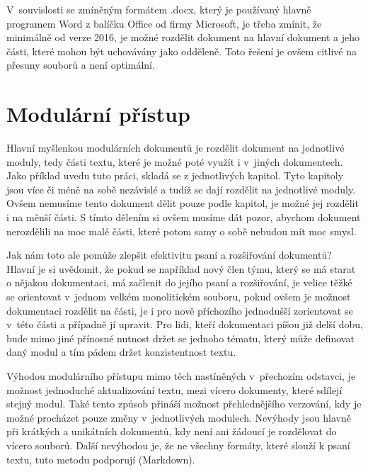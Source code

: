 V~souvislosti se zmíněným formátem .docx, který je používaný hlavně programem Word z balíčku Office od firmy Microsoft, je třeba zmínit, že minimálně od verze 2016, je
možné rozdělit dokument na hlavní dokument a jeho části, které mohou být uchovávány jako odděleně. \cite{msWord} Toto řešení je ovšem citlivé na přesuny souborů
a není optimální.

\section{Modulární přístup}

Hlavní myšlenkou modulárních dokumentů je rozdělit dokument na jednotlivé moduly, tedy části textu, které je možné poté využít i v~jiných dokumentech. Jako příklad uvedu
tuto práci, skladá se z jednotlivých kapitol. Tyto kapitoly jsou více či méně na sobě nezávislé a tudíž se dají rozdělit na jednotlivé moduly. Ovšem nemusíme tento
dokument dělit pouze podle kapitol, je možné jej rozdělit i na měnší části. S tímto dělením si ovšem musíme dát pozor, abychom dokument nerozdělili na moc malé části,
které potom samy o sobě nebudou mít moc smysl.

Jak nám toto ale pomůže zlepšit efektivitu psaní a rozšiřování dokumentů? Hlavní je si uvědomit, že pokud se například nový člen týmu, který se má starat o nějakou
dokumentaci, má začlenit do jejího psaní a rozšiřování, je velice těžké se orientovat v~jednom velkém monolitickém souboru, pokud ovšem je možnost dokumentaci rozdělit
na části, je i pro nově příchozího jednodušší zorientovat se v~této části a případně jí upravit. Pro lidi, kteří dokumentaci píšou již delší dobu, bude mimo jiné přínosné
nutnost držet se jednoho tématu, který může definovat daný modul a tím pádem držet konzistentnost textu. \cite{modularDocuments}

Výhodou modulárního přístupu mimo těch nastíněných v~přechozím odstavci, je možnost jednoduché aktualizování textu, mezi vícero dokumenty, které sdílejí stejný modul. Také
tento způsob přináší možnost přehlednějšího verzování, kdy je možné procházet pouze změny v~jednotlivých modulech. Nevýhody jsou hlavně při krátkých a unikátních dokumentů,
kdy není ani žádoucí je rozdělovat do vícero souborů. Další nevýhodou je, že ne všechny formáty, které slouží k psaní textu, tuto metodu podporují (Markdown).
